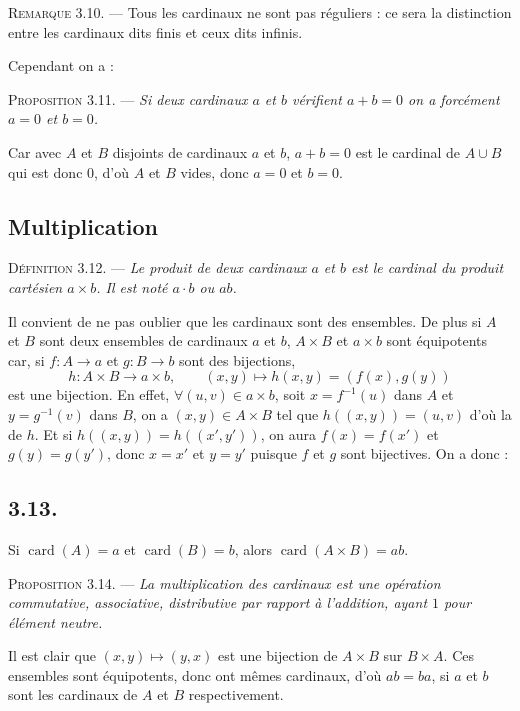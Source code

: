 \medskip\noindent\textsc{Remarque 3.10.} --- Tous les cardinaux ne sont pas réguliers : ce sera la distinction entre les cardinaux dits finis et ceux dits infinis.

Cependant on a :

\medskip\noindent\textsc{Proposition 3.11.} --- \emph{Si deux cardinaux $a$ et $b$ vérifient $a+b=0$ on a forcément $a=0$ et $b=0$.}

Car avec $A$ et $B$ disjoints de cardinaux $a$ et $b$, $a+b=0$ est le cardinal de $A\cup B$ qui est donc $0$, d'où $A$ et $B$ vides, donc $a=0$ et $b=0$. \bookend

\subsection*{Multiplication}

\medskip\noindent\textsc{Définition 3.12.} --- \emph{Le produit de deux cardinaux $a$ et $b$ est le cardinal du produit cartésien $a\times b$. Il est noté $a\cdot b$ ou $ab$.}

Il convient de ne pas oublier que les cardinaux sont des ensembles. De plus si $A$ et $B$ sont deux ensembles de cardinaux $a$ et $b$, $A\times B$ et $a\times b$ sont équipotents car, si $f:A\longrightarrow a$ et $g:B\longrightarrow b$ sont des bijections,
\[
h:A\times B\longrightarrow a\times b,
\qquad (x,y)\longmapsto h(x,y)=(f(x),g(y))
\]
est une bijection. En effet, $\forall(u,v)\in a\times b$, soit $x=f^{-1}(u)$ dans $A$ et $y=g^{-1}(v)$ dans $B$, on a $(x,y)\in A\times B$ tel que $h((x,y))=(u,v)$ d'où la  de $h$. Et si $h((x,y))=h((x',y'))$, on aura $f(x)=f(x')$ et $g(y)=g(y')$, donc $x=x'$ et $y=y'$ puisque $f$ et $g$ sont bijectives. On a donc :

\subsection*{3.13.}
Si $\operatorname{card}(A)=a$ et $\operatorname{card}(B)=b$, alors $\operatorname{card}(A\times B)=ab$.

\medskip\noindent\textsc{Proposition 3.14.} --- \emph{La multiplication des cardinaux est une opération commutative, associative, distributive par rapport à l'addition, ayant $1$ pour élément neutre.}

Il est clair que $(x,y)\mapsto(y,x)$ est une bijection de $A\times B$ sur $B\times A$. Ces ensembles sont équipotents, donc ont mêmes cardinaux, d'où $ab=ba$, si $a$ et $b$ sont les cardinaux de $A$ et $B$ respectivement.

